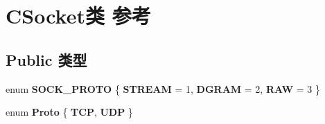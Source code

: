 \hypertarget{class_c_socket}{}\section{C\+Socket类 参考}
\label{class_c_socket}
\subsection*{Public 类型}
\begin{DoxyCompactItemize}
\item 
\mbox{\label{class_c_socket_a1612592be6a8334d298c6e289b7d4ac7}} 
enum {\bfseries S\+O\+C\+K\+\_\+\+P\+R\+O\+TO} \{ {\bfseries S\+T\+R\+E\+AM} = 1, 
{\bfseries D\+G\+R\+AM} = 2, 
{\bfseries R\+AW} = 3
 \}
\item 
\mbox{\label{class_c_socket_a9f5168b936eacaffc83a9ba3200ec00b}} 
enum {\bfseries Proto} \{ {\bfseries T\+CP}, 
{\bfseries U\+DP}
 \}
\end{DoxyCompactItemize}

